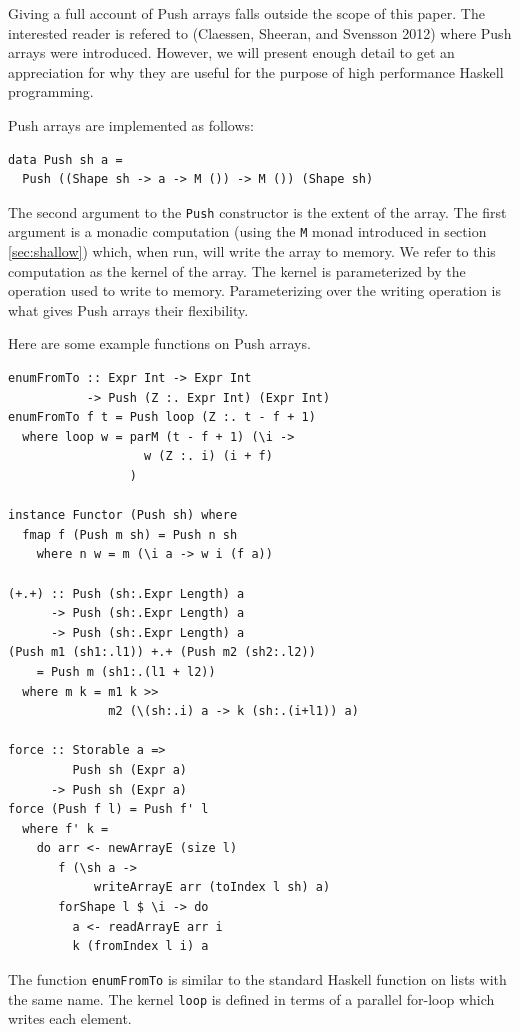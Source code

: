 \documentclass[preprint]{sigplanconf}
\begin{document}
Giving a full account of Push arrays falls outside the scope of this
paper. The interested reader is refered to (Claessen, Sheeran, and
Svensson 2012) where Push arrays were introduced. However, we will
present enough detail to get an appreciation for why they are useful for
the purpose of high performance Haskell programming.

Push arrays are implemented as follows:

\begin{verbatim}
data Push sh a = 
  Push ((Shape sh -> a -> M ()) -> M ()) (Shape sh)
\end{verbatim}

The second argument to the \texttt{Push} constructor is the extent of
the array. The first argument is a monadic computation (using the
\texttt{M} monad introduced in section \ref{sec:shallow}) which, when
run, will write the array to memory. We refer to this computation as the
kernel of the array. The kernel is parameterized by the operation used
to write to memory. Parameterizing over the writing operation is what
gives Push arrays their flexibility.

Here are some example functions on Push arrays.

\begin{verbatim}
enumFromTo :: Expr Int -> Expr Int
           -> Push (Z :. Expr Int) (Expr Int)
enumFromTo f t = Push loop (Z :. t - f + 1)
  where loop w = parM (t - f + 1) (\i ->
                   w (Z :. i) (i + f)
                 )

instance Functor (Push sh) where
  fmap f (Push m sh) = Push n sh
    where n w = m (\i a -> w i (f a))

(+.+) :: Push (sh:.Expr Length) a
      -> Push (sh:.Expr Length) a
      -> Push (sh:.Expr Length) a
(Push m1 (sh1:.l1)) +.+ (Push m2 (sh2:.l2))
    = Push m (sh1:.(l1 + l2))
  where m k = m1 k >>
              m2 (\(sh:.i) a -> k (sh:.(i+l1)) a)

force :: Storable a =>
         Push sh (Expr a)
      -> Push sh (Expr a)
force (Push f l) = Push f' l
  where f' k =
    do arr <- newArrayE (size l)
       f (\sh a ->
            writeArrayE arr (toIndex l sh) a)
       forShape l $ \i -> do
         a <- readArrayE arr i
         k (fromIndex l i) a
\end{verbatim}

The function \texttt{enumFromTo} is similar to the standard Haskell
function on lists with the same name. The kernel \texttt{loop} is
defined in terms of a parallel for-loop which writes each element.
\end{document}
